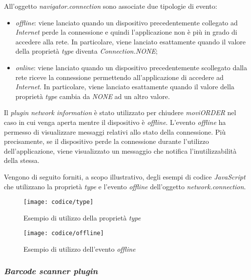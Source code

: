 All'oggetto \textit{navigator.connection} sono associate due tipologie di evento:
\begin{itemize}
	\item \textit{offline}: viene lanciato quando un dispositivo precedentemente collegato ad \textit{Internet} perde la connessione e quindi l'applicazione non è più in grado di accedere alla rete. In particolare, viene lanciato esattamente quando il valore della proprietà \textit{type} diventa \textit{Connection.NONE};
	\item \textit{online}: viene lanciato quando un dispositivo precedentemente scollegato dalla rete riceve la connessione permettendo all'applicazione di accedere ad \textit{Internet}. In particolare, viene lanciato esattamente quando il valore della proprietà \textit{type} cambia da \textit{NONE} ad un altro valore.
\end{itemize}
Il \textit{plugin} \textit{network information} è stato utilizzato per chiudere \textit{moviORDER} nel caso in cui venga aperta mentre il dispositivo è \textit{offline}. L'evento \textit{offline} ha permesso di visualizzare messaggi relativi allo stato della connessione. Più precisamente, se il dispositivo perde la connessione durante l'utilizzo dell'applicazione, viene visualizzato un messaggio che notifica l'inutilizzabilità della stessa.

Vengono di seguito forniti, a scopo illustrativo, degli esempi di codice \textit{JavaScript} che utilizzano la proprietà \textit{type} e l'evento \textit{offline} dell'oggetto \textit{network.connection}.

\begin{figure}[!h] 
    \centering 
    \texttt{[image: codice/type]} 
    \caption{Esempio di utilizzo della proprietà \textit{type}}
\end{figure}

\begin{figure}[!h] 
    \centering 
    \texttt{[image: codice/offline]} 
    \caption{Esempio di utilizzo dell'evento \textit{offline}}
\end{figure}

\subsubsection{\textit{Barcode scanner plugin}}

